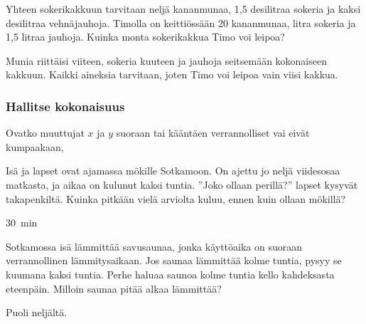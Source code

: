 \begin{tehtavasivu}
\begin{tehtava}
Yhteen sokerikakkuun tarvitaan neljä kananmunaa, 1,5 desilitraa sokeria ja kaksi desilitraa vehnäjauhoja. Timolla on keittiössään 20 kananmunaa, litra sokeria ja 1,5 litraa jauhoja. Kuinka monta sokerikakkua Timo voi leipoa?  
\begin{vastaus}
Munia riittäisi viiteen, sokeria kuuteen ja jauhoja seitsemään kokonaiseen kakkuun. Kaikki aineksia tarvitaan, joten Timo voi leipoa vain viisi kakkua.
\end{vastaus}
\end{tehtava}

\subsubsection*{Hallitse kokonaisuus}

\begin{tehtava}
Ovatko muuttujat $ x $ ja $ y $ suoraan tai kääntäen verrannolliset vai eivät kumpaakaan,
\begin{alakohdat}
\end{alakohdat}
\begin{vastaus}
\begin{alakohdat}
\end{alakohdat}
\end{vastaus}
\end{tehtava}

\begin{tehtava}
Isä ja lapset ovat ajamassa mökille Sotkamoon. On ajettu jo neljä viidesosaa matkasta, ja aikaa on kulunut kaksi tuntia. ''Joko ollaan perillä?'' lapset kysyvät takapenkiltä. Kuinka pitkään vielä arviolta kuluu, ennen kuin ollaan mökillä?
    \begin{vastaus}
        $30$~min
    \end{vastaus}
\end{tehtava}

\begin{tehtava}
Sotkamossa isä lämmittää savusaunaa, jonka käyttöaika on suoraan verrannollinen lämmitysaikaan. Jos saunaa lämmittää kolme tuntia, pysyy se kuumana kaksi tuntia. Perhe haluaa saunoa kolme tuntia kello kahdeksasta eteenpäin. Milloin saunaa pitää alkaa lämmittää?
\begin{vastaus}
Puoli neljältä.
\end{vastaus}
\end{tehtava}


\end{tehtavasivu}
